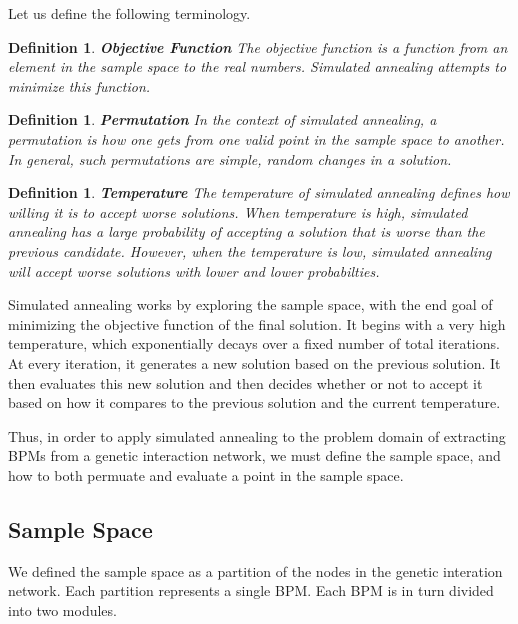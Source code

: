 \documentclass[11pt]{article}
\newtheorem{definition}[theorem]{Definition}
\begin{document}
\par Let us define the following terminology. 

\begin{definition}
{\bf Objective Function} The objective function is a function from an element in the sample space to the real numbers. Simulated annealing attempts to minimize this function.
\end{definition}
 
\begin{definition}
{\bf Permutation} In the context of simulated annealing, a permutation is how one gets from one valid point in the sample space to another. In general, such permutations are simple, random changes in a solution. 
\end{definition}


\begin{definition}
{\bf Temperature} The temperature of simulated annealing defines how willing it is to accept worse solutions. When temperature is high, simulated annealing has a large probability of accepting a solution that is worse than the previous candidate. However, when the temperature is low, simulated annealing will accept worse solutions with lower and lower probabilties. 
\end{definition}

\par Simulated annealing works by exploring the sample space, with the end goal of minimizing the objective function of the final solution. It begins with a very high temperature, which exponentially decays over a fixed number of total iterations. At every iteration, it generates a new solution based on the previous solution. It then  evaluates this new solution and then decides whether or not to accept it based on how it compares to the previous solution and the current temperature.

\par Thus, in order to apply simulated annealing to the problem domain of extracting BPMs from a genetic interaction network, we must define the sample space, and how to both permuate and evaluate a point in the sample space. 



\subsection{Sample Space}
\par We defined the sample space as a partition of the nodes in the genetic interation network. Each partition represents a single BPM. Each BPM is in turn divided into two modules.
\end{document}
